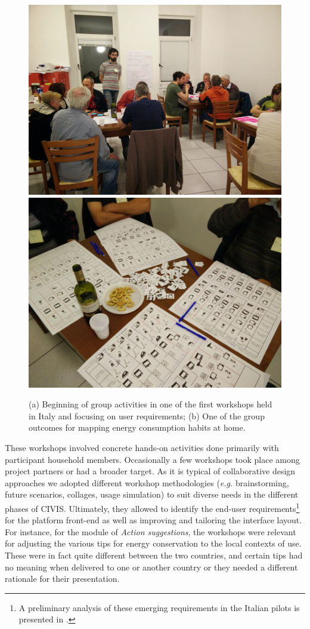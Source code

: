 
\begin{figure}[t]
      	\sidecaption[t]
        \includegraphics[width=.3\linewidth]{img/Workshop_userreq1.jpg}
	        \includegraphics[width=.3\linewidth]{img/Workshop_userreq2.jpg} 
    \caption{(a) Beginning of group activities in one of the first workshops held in Italy and focusing
    on user requirements; (b) One of the group outcomes for mapping energy consumption habits at home. 
}
\label{fig:workshops}
\end{figure}

These workshops involved concrete hands-on activities done primarily with participant household members.
Occasionally a few workshops took place among project partners or had a broader target.
As it is typical of collaborative design approaches we adopted different workshop methodologies (\textit{e.g.} brainstorming, future scenarios,
collages, usage simulation) to suit diverse needs in the different phases of CIVIS.
Ultimately, they allowed to identify the end-user requirements\footnote{A preliminary analysis of these emerging requirements in the Italian pilots
is presented in \cite{capaccioli_participatory_2016}.} for the platform front-end as well as
improving and tailoring the interface layout.
% 
For instance, for the module of \textit{Action suggestions}, the workshops were relevant for adjusting the various
tips for energy conservation to the local contexts of use. These were in fact quite different between the two countries,
 and certain tips had no meaning when delivered to one or another country or they needed a different
 rationale for their presentation.
 

